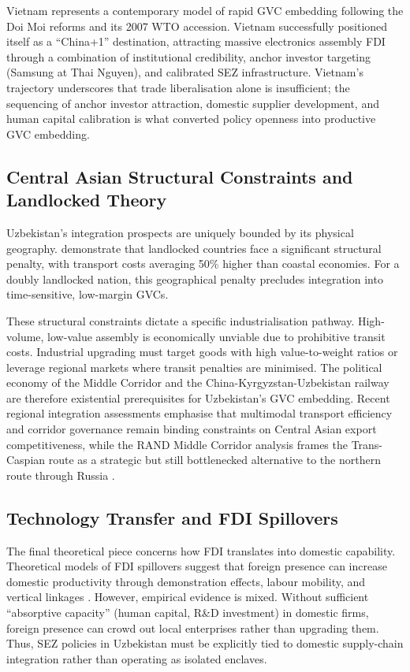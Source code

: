 Vietnam represents a contemporary model of rapid GVC embedding following the Doi Moi reforms and its 2007 WTO accession. Vietnam successfully positioned itself as a ``China+1'' destination, attracting massive electronics assembly FDI through a combination of institutional credibility, anchor investor targeting (Samsung at Thai Nguyen), and calibrated SEZ infrastructure. Vietnam's trajectory underscores that trade liberalisation alone is insufficient; the sequencing of anchor investor attraction, domestic supplier development, and human capital calibration is what converted policy openness into productive GVC embedding.

\subsection{Central Asian Structural Constraints and Landlocked Theory}

Uzbekistan's integration prospects are uniquely bounded by its physical geography. \citet{limao2001} demonstrate that landlocked countries face a significant structural penalty, with transport costs averaging 50\% higher than coastal economies. For a doubly landlocked nation, this geographical penalty precludes integration into time-sensitive, low-margin GVCs.

These structural constraints dictate a specific industrialisation pathway. High-volume, low-value assembly is economically unviable due to prohibitive transit costs. Industrial upgrading must target goods with high value-to-weight ratios or leverage regional markets where transit penalties are minimised. The political economy of the Middle Corridor and the China-Kyrgyzstan-Uzbekistan railway are therefore existential prerequisites for Uzbekistan's GVC embedding. Recent regional integration assessments emphasise that multimodal transport efficiency and corridor governance remain binding constraints on Central Asian export competitiveness, while the RAND Middle Corridor analysis frames the Trans-Caspian route as a strategic but still bottlenecked alternative to the northern route through Russia \citep{adb2024aeir, rand2024middlecorridor}.

\subsection{Technology Transfer and FDI Spillovers}

The final theoretical piece concerns how FDI translates into domestic capability. Theoretical models of FDI spillovers suggest that foreign presence can increase domestic productivity through demonstration effects, labour mobility, and vertical linkages \citep{dunning1981}. However, empirical evidence is mixed. Without sufficient ``absorptive capacity'' (human capital, R\&D investment) in domestic firms, foreign presence can crowd out local enterprises rather than upgrading them. Thus, SEZ policies in Uzbekistan must be explicitly tied to domestic supply-chain integration rather than operating as isolated enclaves.

